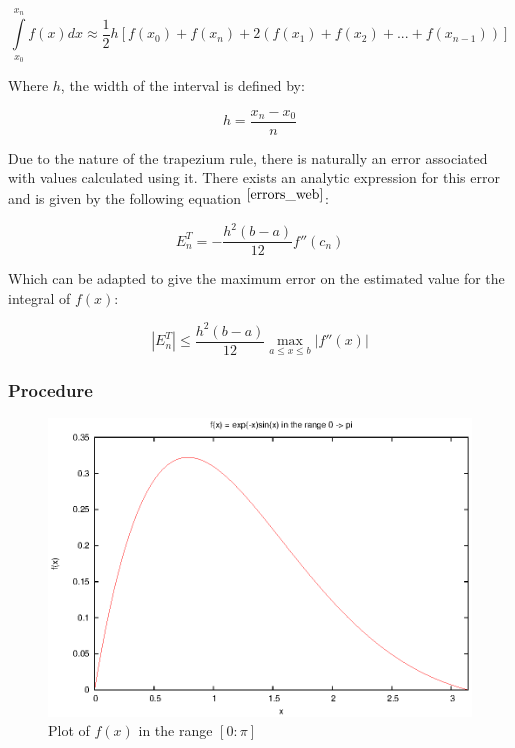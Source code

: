 \documentclass[pdf,color]{UoBnote}
\begin{document}
			\begin{equation} \label{eq:trapezium}
				\int\limits_{x_0}^{x_n} f(x) dx \approx \frac{1}{2}h\left[f(x_0) + f(x_n) + 2(f(x_1) + f(x_2) +...+ f(x_{n-1}))\right]
			\end{equation}
			
			Where $h$, the width of the interval is defined by:
			
			\begin{equation} \label{eq:h_def}
				h = \frac{x_n - x_0}{n}
			\end{equation}
			
			Due to the nature of the trapezium rule, there is naturally an error associated with values calculated using it.
			There exists an analytic expression for this error and is given by the following equation $^{\cite{errors_web}}$:
			
			
			\begin{equation} \label{eq:trap_err}
				E_n^T = -\frac{h^2\left(b-a\right)}{12}f''(c_n)
			\end{equation}
			
			Which can be adapted to give the maximum error on the estimated value for the integral of $f(x)$:
			
			\begin{equation} \label{eq:trap_err2}
				\left|E_n^T\right| \leq \frac{h^2\left(b-a\right)}{12}\max_{a \leq x \leq b}\left|f''(x)\right|
			\end{equation}
			
			
			\subsubsection{Procedure}
				
				\begin{figure}[h]
					\centering
						\includegraphics{figures/q2b.eps}
					\caption{Plot of $f(x)$ in the range $[0:\pi]$}
					\label{fig:q2b}
				\end{figure}
				
\end{document}
